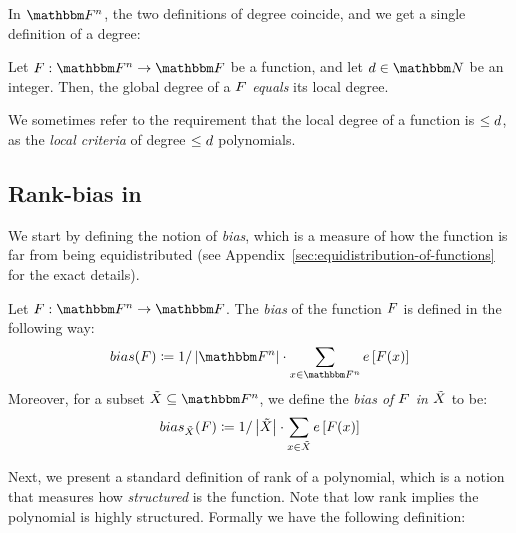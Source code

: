 In $\field$, the two definitions of degree coincide, and we get a single definition of a degree:
\begin{lemma}\label{lemma:alternative-definition-for-polynomial-using-derivatives}
    Let $\funcdef{\genfunc}{\field}{\basefield}$ be a function, and let $\degree \in \naturalnumbersset$ be an integer.
    Then, the global degree of a $\genfunc$ \emph{equals} its local degree.
\end{lemma}
\begin{remark}
    We sometimes refer to the requirement that the local degree of a function is $\leq d$,
    as the \emph{local criteria} of degree $\leq d$ polynomials.
\end{remark}

\subsection[Rank-bias in \titlefield]{Rank-bias in \titlefield}
We start by defining the notion of \emph{bias}, which is a measure of how the function is far from being equidistributed (see Appendix~\ref{sec:equidistribution-of-functions} for the exact details).
\begin{definition}[Bias]
    Let $\funcdef{\genfunc}{\field}{\basefield}$.
    The \emph{bias} of the function $\genfunc$ is defined in the following way:
    \[
        \bias{\genfunc} \definedas 1 / \abs{\field} \cdot \sum_{x \in \field}{\charfunc{\genfunc(x)}}
    \]
    Moreover, for a subset $\variety \subseteq \field$, we define the \emph{bias of $\genfunc$ in ${\tilde{X}}$} to be:
    \[
        \relbias{\variety}{\genfunc} \definedas 1 / \abs{\variety} \cdot \sum_{x \in \variety}{\charfunc{\genfunc(x)}}
    \]
\end{definition}
Next, we present a standard definition of rank of a polynomial, which is a notion that measures how \emph{structured} is the function.
Note that low rank implies the polynomial is highly structured.
Formally we have the following definition:
